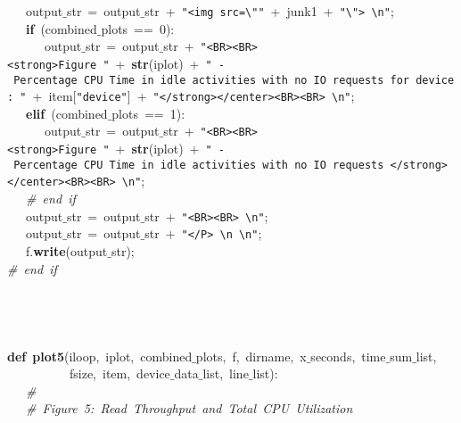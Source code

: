 \mbox{}\ \ \ output$\_$str\ =\ output$\_$str\ +\ \texttt{"{}\textless{}img\ src=\textbackslash{}"{}"{}}\ +\ junk1\ +\ \texttt{"{}\textbackslash{}"{}\textgreater{}\ \textbackslash{}n"{}}; \\
\mbox{}\ \ \ \textbf{if}\ (combined$\_$plots\ ==\ 0): \\
\mbox{}\ \ \ \ \ \ output$\_$str\ =\ output$\_$str\ +\ \texttt{"{}\textless{}BR\textgreater{}\textless{}BR\textgreater{}\textless{}strong\textgreater{}Figure\ "{}}\ +\ \textbf{str}(iplot)\ +\ \texttt{"{}\ -\ Percentage\ CPU\ Time\ in\ idle\ activities\ with\ no\ IO\ requests\ for\ device:\ "{}}\ +\ item[\texttt{"{}device"{}}]\ +\ \texttt{"{}\textless{}/strong\textgreater{}\textless{}/center\textgreater{}\textless{}BR\textgreater{}\textless{}BR\textgreater{}\ \textbackslash{}n"{}}; \\
\mbox{}\ \ \ \textbf{elif}\ (combined$\_$plots\ ==\ 1): \\
\mbox{}\ \ \ \ \ \ output$\_$str\ =\ output$\_$str\ +\ \texttt{"{}\textless{}BR\textgreater{}\textless{}BR\textgreater{}\textless{}strong\textgreater{}Figure\ "{}}\ +\ \textbf{str}(iplot)\ +\ \texttt{"{}\ -\ Percentage\ CPU\ Time\ in\ idle\ activities\ with\ no\ IO\ requests\ \textless{}/strong\textgreater{}\textless{}/center\textgreater{}\textless{}BR\textgreater{}\textless{}BR\textgreater{}\ \textbackslash{}n"{}}; \\
\mbox{}\ \ \ \textit{\#\ end\ if} \\
\mbox{}\ \ \ output$\_$str\ =\ output$\_$str\ +\ \texttt{"{}\textless{}BR\textgreater{}\textless{}BR\textgreater{}\ \textbackslash{}n"{}}; \\
\mbox{}\ \ \ output$\_$str\ =\ output$\_$str\ +\ \texttt{"{}\textless{}/P\textgreater{}\ \textbackslash{}n\ \textbackslash{}n"{}}; \\
\mbox{}\ \ \ f.\textbf{write}(output$\_$str); \\
\mbox{}\textit{\#\ end\ if} \\
\mbox{} \\
\mbox{} \\
\mbox{} \\
\mbox{} \\
\mbox{}\textbf{def}\ \textbf{plot5}(iloop,\ iplot,\ combined$\_$plots,\ f,\ dirname,\ x$\_$seconds,\ time$\_$sum$\_$list, \\
\mbox{}\ \ \ \ \ \ \ \ \ \ fsize,\ item,\ device$\_$data$\_$list,\ line$\_$list): \\
\mbox{}\ \ \ \textit{\#} \\
\mbox{}\ \ \ \textit{\#\ Figure\ 5:\ Read\ Throughput\ and\ Total\ CPU\ Utilization} \\
